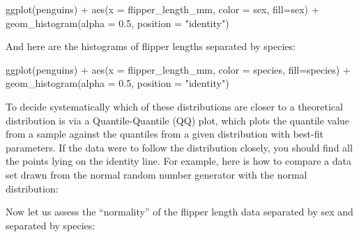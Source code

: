 \documentclass[
  letterpaper,
  DIV=11,
  numbers=noendperiod]{scrreprt}
\newenvironment{Shaded}{\begin{snugshade}}{\end{snugshade}}
\newcommand{\NormalTok}[1]{\textcolor[rgb]{0.00,0.23,0.31}{#1}}
\begin{document}
\begin{Shaded}
\begin{Highlighting}[]
\NormalTok{ggplot(penguins) +}
\NormalTok{  aes(x = flipper\_length\_mm, color = sex, fill=sex) + geom\_histogram(alpha = 0.5, position = "identity")}
\end{Highlighting}
\end{Shaded}

And here are the histograms of flipper lengths separated by species:

\begin{Shaded}
\begin{Highlighting}[]
\NormalTok{ggplot(penguins) +}
\NormalTok{  aes(x = flipper\_length\_mm, color = species, fill=species) + geom\_histogram(alpha = 0.5, position = "identity")}
\end{Highlighting}
\end{Shaded}

To decide systematically which of these distributions are closer to a
theoretical distribution is via a Quantile-Quantile (QQ) plot, which
plots the quantile value from a sample against the quantiles from a
given distribution with best-fit parameters. If the data were to follow
the distribution closely, you should find all the points lying on the
identity line. For example, here is how to compare a data set drawn from
the normal random number generator with the normal distribution:

\begin{Shaded}
\end{Shaded}

Now let us assess the ``normality'' of the flipper length data separated
by sex and separated by species:
\end{document}

